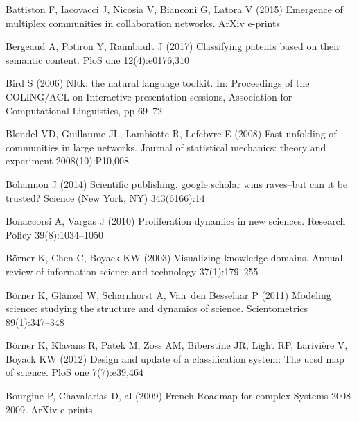\begin{thebibliography}{84}
{Battiston} F, {Iacovacci} J, {Nicosia} V, {Bianconi} G, {Latora} V (2015)
  {Emergence of multiplex communities in collaboration networks}. ArXiv
  e-prints 

Bergeaud A, Potiron Y, Raimbault J (2017) Classifying patents based on their
  semantic content. PloS one 12(4):e0176,310

Bird S (2006) Nltk: the natural language toolkit. In: Proceedings of the
  COLING/ACL on Interactive presentation sessions, Association for
  Computational Linguistics, pp 69--72

Blondel VD, Guillaume JL, Lambiotte R, Lefebvre E (2008) Fast unfolding of
  communities in large networks. Journal of statistical mechanics: theory and
  experiment 2008(10):P10,008

Bohannon J (2014) Scientific publishing. google scholar wins raves--but can it
  be trusted? Science (New York, NY) 343(6166):14

Bonaccorsi A, Vargas J (2010) Proliferation dynamics in new sciences. Research
  Policy 39(8):1034--1050

B{\"o}rner K, Chen C, Boyack KW (2003) Visualizing knowledge domains. Annual
  review of information science and technology 37(1):179--255

B{\"o}rner K, Gl{\"a}nzel W, Scharnhorst A, Van~den Besselaar P (2011) Modeling
  science: studying the structure and dynamics of science. Scientometrics
  89(1):347--348

B{\"o}rner K, Klavans R, Patek M, Zoss AM, Biberstine JR, Light RP,
  Larivi{\`e}re V, Boyack KW (2012) Design and update of a classification
  system: The ucsd map of science. PloS one 7(7):e39,464

{Bourgine} P, {Chavalarias} D, al (2009) {French Roadmap for complex Systems
  2008-2009}. ArXiv e-prints 


\end{thebibliography}
